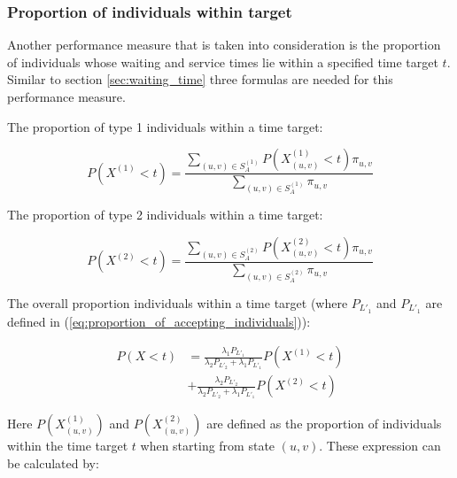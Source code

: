 \subsubsection{Proportion of individuals within target}

Another performance measure that is taken into consideration is the proportion 
of individuals whose waiting and service times lie within a specified 
time target \(t\).
Similar to section \ref{sec:waiting_time} three formulas are needed for this 
performance measure.

The proportion of type 1 individuals within a time target:

\begin{equation}\label{eq:proportion_within_target_type_1}
    P(X^{(1)} < t) = \frac{\sum_{(u,v) \in S_A^{(1)}} P(X_{(u,v)}^{(1)} < t) 
    \pi_{u,v} }{\sum_{(u,v) \in S_A^{(1)}} \pi_{u,v}}
\end{equation}

The proportion of type 2 individuals within a time target:

\begin{equation}\label{eq:proportion_within_target_type_2}
    P(X^{(2)} < t) = \frac{\sum_{(u,v) \in S_A^{(2)}} P(X_{(u,v)}^{(2)} < t) 
    \pi_{u,v} }{\sum_{(u,v) \in S_A^{(2)}} \pi_{u,v}}
\end{equation}

The overall proportion individuals within a time target (where \(P_{L'_1}\) and 
\(P_{L'_1}\) are defined in (\ref{eq:proportion_of_accepting_individuals})):

\begin{align}
    P(X < t) &= \frac{\lambda_1 P_{L'_1}}{\lambda_2 P_{L'_2}+\lambda_1 P_{L'_1}} 
    P(X^{(1)} < t) \nonumber \\
    &+ \frac{\lambda_2 P_{L'_2}}{\lambda_2 P_{L'_2} + \lambda_1 
    P_{L'_1}} P(X^{(2)} < t) \label{eq:overall_proportion_within_target}
\end{align}

Here \(P(X_{(u,v)}^{(1)})\) and \(P(X_{(u,v)}^{(2)})\) are defined as the
proportion of individuals within the time target \(t\) when starting from state 
\((u,v)\).
These expression can be calculated by:

